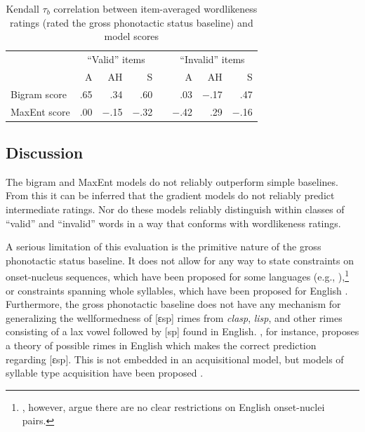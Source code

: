 \begin{table}[t]
\centering
\begin{tabular}{l rrr c rrr}
\toprule                
             & \multicolumn{3}{c}{``Valid'' items} && \multicolumn{3}{c}{``Invalid'' items} \\
\cmidrule{2-4} \cmidrule{6-8}
             &         A &       AH &        S &&     A  &       AH &          S \\
\midrule
Bigram score &     {.65} &    {.34} &    {.60} &&    {.03} & {$-$.17} &    {.47} \\
MaxEnt score &     {.00} & {$-$.15} & {$-$.32} && {$-$.42} &    {.29} & {$-$.16} \\
\bottomrule
\end{tabular}
\caption{Kendall $\tau_{b}$ correlation between item-averaged wordlikeness ratings (rated the gross phonotactic status baseline) and model scores}
\label{resid}
\end{table}

\subsection{Discussion}

The bigram and MaxEnt models do not reliably outperform simple baselines. From this it can be inferred that the gradient models do not reliably predict intermediate ratings. Nor do these models reliably distinguish within classes of ``valid'' and ``invalid'' words in a way that conforms with wordlikeness ratings.

A serious limitation of this evaluation is the primitive nature of the gross phonotactic status baseline. It does not allow for any way to state constraints on onset-nucleus sequences, which have been proposed for some languages (e.g., \citealt{Kirby2007}),\footnote{\citet{Kessler1997}, however, argue there are no clear restrictions on English onset-nuclei pairs.} or constraints spanning whole syllables, which have been proposed for English \citep[e.g.,][]{Berkley1994b,Berkley1994a,Coetzee2008b,Fudge1969}. Furthermore, the gross phonotactic baseline does not have any mechanism for generalizing the wellformedness of [ɛsp] rimes from \emph{clasp}, \emph{lisp}, and other rimes consisting of a lax vowel followed by [sp] found in English. \citet{Borowsky1989}, for instance, proposes a theory of possible rimes in English which makes the correct prediction regarding [ɛsp]. This is not embedded in an acquisitional model, but models of syllable type acquisition have been proposed \citep[e.g.,][]{Fikkert1994,Levelt2000,Pan2003,Pan2004}. 

